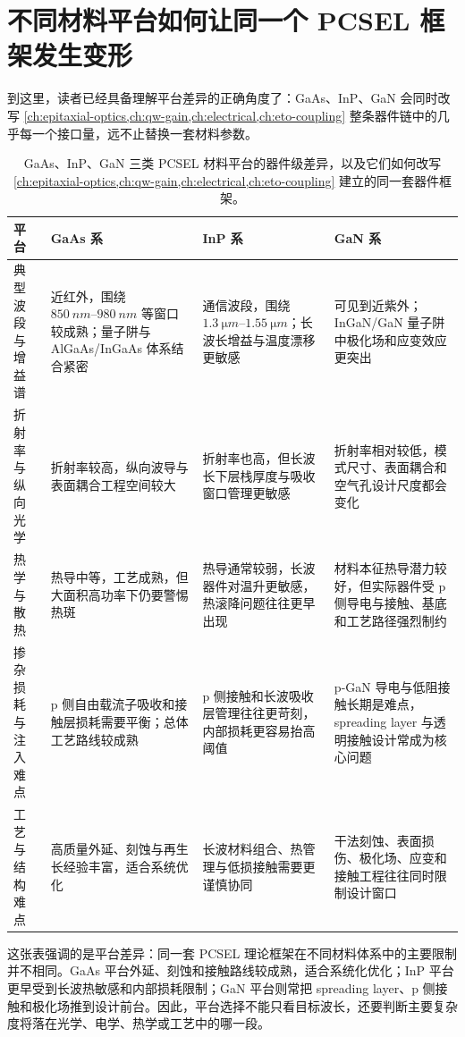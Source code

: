 \section{不同材料平台如何让同一个 PCSEL 框架发生变形}
到这里，读者已经具备理解平台差异的正确角度了：GaAs、InP、GaN 会同时改写 \cref{ch:epitaxial-optics,ch:qw-gain,ch:electrical,ch:eto-coupling} 整条器件链中的几乎每一个接口量，远不止替换一套材料参数。

\begin{table}[htbp]
  \centering
  \small
  \begin{tabularx}{\textwidth}{@{}lYYY@{}}
    \toprule
    平台 & GaAs 系 & InP 系 & GaN 系 \\
    \midrule
    典型波段与增益谱 & 近红外，围绕 $\SIrange{850}{980}{nm}$ 等窗口较成熟；量子阱与 AlGaAs/InGaAs 体系结合紧密 & 通信波段，围绕 $\SIrange{1.3}{1.55}{\micro m}$；长波长增益与温度漂移更敏感 & 可见到近紫外；InGaN/GaN 量子阱中极化场和应变效应更突出 \\
    折射率与纵向光学 & 折射率较高，纵向波导与表面耦合工程空间较大 & 折射率也高，但长波长下层栈厚度与吸收窗口管理更敏感 & 折射率相对较低，模式尺寸、表面耦合和空气孔设计尺度都会变化 \\
    热学与散热 & 热导中等，工艺成熟，但大面积高功率下仍要警惕热斑 & 热导通常较弱，长波器件对温升更敏感，热滚降问题往往更早出现 & 材料本征热导潜力较好，但实际器件受 p 侧导电与接触、基底和工艺路径强烈制约 \\
    掺杂损耗与注入难点 & p 侧自由载流子吸收和接触层损耗需要平衡；总体工艺路线较成熟 & p 侧接触和长波吸收层管理往往更苛刻，内部损耗更容易抬高阈值 & p-GaN 导电与低阻接触长期是难点，spreading layer 与透明接触设计常成为核心问题 \\
    工艺与结构难点 & 高质量外延、刻蚀与再生长经验丰富，适合系统优化 & 长波材料组合、热管理与低损接触需要更谨慎协同 & 干法刻蚀、表面损伤、极化场、应变和接触工程往往同时限制设计窗口 \\
    \bottomrule
  \end{tabularx}
  \caption{GaAs、InP、GaN 三类 PCSEL 材料平台的器件级差异，以及它们如何改写 \cref{ch:epitaxial-optics,ch:qw-gain,ch:electrical,ch:eto-coupling} 建立的同一套器件框架。}
  \label{tab:platform_compare}
\end{table}

这张表强调的是平台差异：同一套 PCSEL 理论框架在不同材料体系中的主要限制并不相同。GaAs 平台外延、刻蚀和接触路线较成熟，适合系统化优化；InP 平台更早受到长波热敏感和内部损耗限制；GaN 平台则常把 spreading layer、p 侧接触和极化场推到设计前台。因此，平台选择不能只看目标波长，还要判断主要复杂度将落在光学、电学、热学或工艺中的哪一段。

